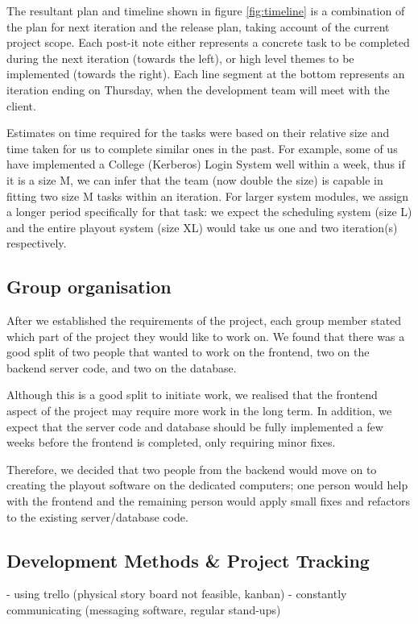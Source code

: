\documentclass[a4paper]{article}
\begin{document}
The resultant plan and timeline shown in figure \ref{fig:timeline} is a
combination of the plan for next iteration and the release plan, taking account
of the current project scope. Each post-it note either represents a 
concrete task to be completed during the next iteration (towards the left), or
high level themes to be implemented (towards the right). Each line segment at
the bottom represents an iteration ending on Thursday, when the development
team will meet with the client.

Estimates on time required for the tasks were based on their relative size and
time taken for us to complete similar ones in the past. For example, some of us
have implemented a College (Kerberos) Login System well within a week, thus if
it is a size M, we can infer that the team (now double the size) is capable in 
fitting two size M tasks within an iteration. For larger system modules, we
assign a longer period specifically for that task: we expect the scheduling
system (size L) and the entire playout system (size XL) would take us one and
two iteration(s) respectively.


\subsection{Group organisation}
After we established the requirements of the project, each group member stated
which part of the project they would like to work on. We found that there was a
good split of two people that wanted to work on the frontend, two on the backend
server code, and two on the database.

Although this is a good split to initiate work, we realised that the frontend 
aspect of the project may require more work in the long term. In addition, we 
expect that the server code and database should be fully implemented a few
weeks before the frontend is completed, only requiring minor fixes.

Therefore, we decided that two people from the backend would move on to creating
the playout software on the dedicated computers; one person would help with the
frontend and the remaining person would apply small fixes and refactors to the
existing server/database code. 


\subsection{Development Methods \& Project Tracking}
  - using trello (physical story board not feasible, kanban)
  - constantly communicating (messaging software, regular stand-ups)
\end{document}
